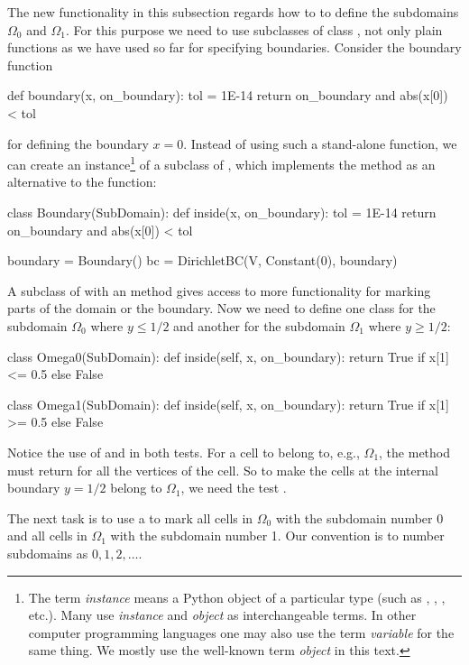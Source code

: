 The new functionality in this subsection regards how to
to define the subdomains
$\Omega_0$ and $\Omega_1$. For this purpose we need to
use subclasses of class ,
not only plain functions as we have used so far
for specifying boundaries. Consider the boundary function
\begin{python}
def boundary(x, on_boundary):
    tol = 1E-14
    return on_boundary and abs(x[0]) < tol
\end{python}
for defining the boundary $x=0$. Instead of using such a stand-alone
function, we can create an instance\footnote{The term \emph{instance}
means a Python object of a particular type (such as ,
,
, etc.).
Many use \emph{instance} and \emph{object}
as interchangeable terms. In other computer programming languages one may
also use the term \emph{variable} for the same thing.
We mostly use the well-known  term \emph{object} in this text.}
of a subclass of ,
which implements the  method as an alternative to the
 function:
\begin{python}
class Boundary(SubDomain):
    def inside(x, on_boundary):
        tol = 1E-14
        return on_boundary and abs(x[0]) < tol

boundary = Boundary()
bc = DirichletBC(V, Constant(0), boundary)
\end{python}

A subclass of  with an  method gives
access to more functionality for marking parts of the domain or
the boundary. Now we need to define one class for the
subdomain $\Omega_0$
where $y\leqslant 1/2$ and another for the subdomain $\Omega_1$ where $y\geqslant 1/2$:
\begin{python}
class Omega0(SubDomain):
    def inside(self, x, on_boundary):
        return True if x[1] <= 0.5 else False

class Omega1(SubDomain):
    def inside(self, x, on_boundary):
        return True if x[1] >= 0.5 else False
\end{python}
Notice the use of \emp{<=} and \emp{>=} in both tests. For a cell to
belong to, e.g., $\Omega_1$, the  method must return
 for all the vertices  of the cell. So to make the
cells at the internal boundary $y=1/2$ belong to $\Omega_1$, we need
the test .

The next task is to use a  to mark all
cells in $\Omega_0$ with the subdomain number 0 and all cells in $\Omega_1$
with the subdomain number 1.
Our convention is to number subdomains as $0,1,2,\ldots$.

